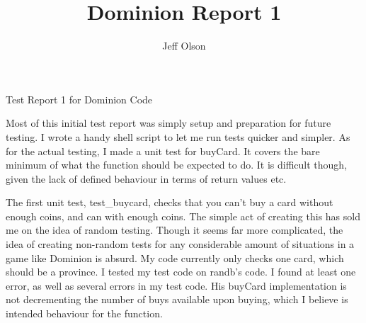 \documentclass{article}
\title{Dominion Report 1}
\author{Jeff Olson}
\begin{document}
\centerline{\sc \large Test Report 1 for Dominion Code}
\vspace{1pc}
Most of this initial test report was simply setup and preparation for future testing. I wrote a handy shell script to let me run tests quicker and simpler.
\vspace{1pc}
As for the actual testing, I made a unit test for buyCard. It covers the bare minimum of what the function should be expected to do. It is difficult though, given the lack of defined behaviour in terms of return values etc.

The first unit test, test\_buycard, checks that you can't buy a card without enough coins, and can with enough coins. The simple act of creating this has sold me on the idea of random testing. Though it seems far more complicated, the idea of creating non-random tests for any considerable amount of situations in a game like Dominion is absurd. My code currently only checks one card, which should be a province. I tested my test code on randb's code. I found at least one error, as well as several errors in my test code. His buyCard implementation is not decrementing the number of buys available upon buying, which I believe is intended behaviour for the function.
\end{document}
